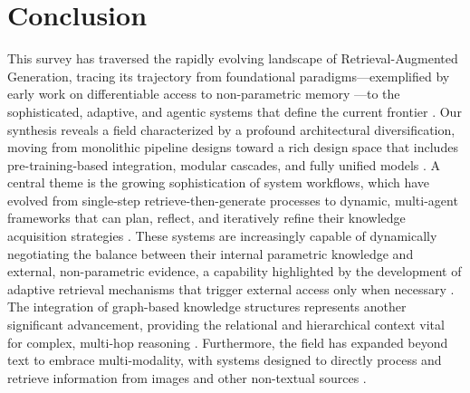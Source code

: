 \documentclass[11pt,a4paper]{article}
\begin{document}
\section{Conclusion}


This survey has traversed the rapidly evolving landscape of Retrieval-Augmented Generation, tracing its trajectory from foundational paradigms---exemplified by early work on differentiable access to non-parametric memory \cite{arxiv:2005.11401v4}---to the sophisticated, adaptive, and agentic systems that define the current frontier \cite{arxiv:2501.09136v4,arxiv:2506.10408v1}. Our synthesis reveals a field characterized by a profound architectural diversification, moving from monolithic pipeline designs toward a rich design space that includes pre-training-based integration, modular cascades, and fully unified models \cite{arxiv:2410.03439v3}. A central theme is the growing sophistication of system workflows, which have evolved from single-step retrieve-then-generate processes to dynamic, multi-agent frameworks that can plan, reflect, and iteratively refine their knowledge acquisition strategies \cite{arxiv:2502.18635v2,arxiv:2305.06983v2,arxiv:2411.19443v1}. These systems are increasingly capable of dynamically negotiating the balance between their internal parametric knowledge and external, non-parametric evidence, a capability highlighted by the development of adaptive retrieval mechanisms that trigger external access only when necessary \cite{arxiv:2212.10511v4,arxiv:2410.01782v1,arxiv:2502.01142v2}. The integration of graph-based knowledge structures represents another significant advancement, providing the relational and hierarchical context vital for complex, multi-hop reasoning \cite{arxiv:2410.05779v3,arxiv:2502.06864v1,arxiv:2501.13958v3}. Furthermore, the field has expanded beyond text to embrace multi-modality, with systems designed to directly process and retrieve information from images and other non-textual sources \cite{arxiv:2410.10594v2,arxiv:2503.18016v1}.
\end{document}
